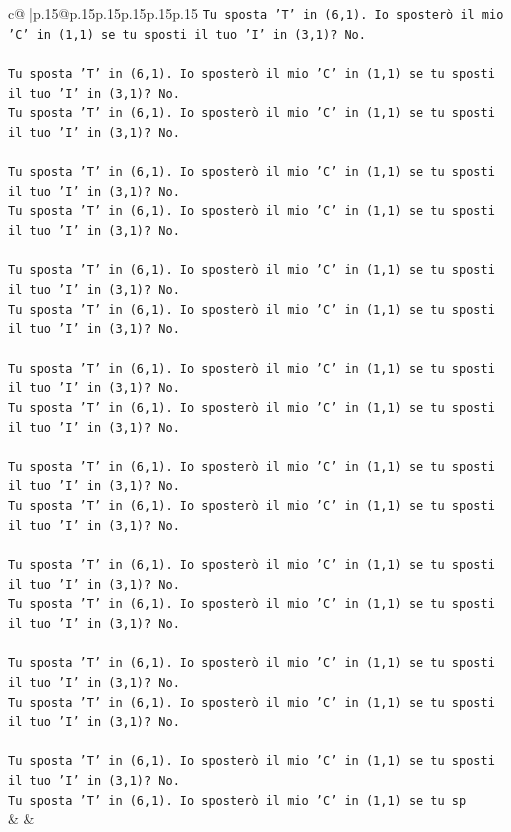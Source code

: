 \documentclass{article}
\begin{document}
{\begin{supertabular}{c@{$\;$}|p{.15\linewidth}@{}p{.15\linewidth}p{.15\linewidth}p{.15\linewidth}p{.15\linewidth}p{.15\linewidth}}
{{{\texttt{Tu sposta 'T' in (6,1). Io sposterò il mio 'C' in (1,1) se tu sposti il tuo 'I' in (3,1)? No.} \\
\\ 
\texttt{Tu sposta 'T' in (6,1). Io sposterò il mio 'C' in (1,1) se tu sposti il tuo 'I' in (3,1)? No.} \\
\texttt{Tu sposta 'T' in (6,1). Io sposterò il mio 'C' in (1,1) se tu sposti il tuo 'I' in (3,1)? No.} \\
\\ 
\texttt{Tu sposta 'T' in (6,1). Io sposterò il mio 'C' in (1,1) se tu sposti il tuo 'I' in (3,1)? No.} \\
\texttt{Tu sposta 'T' in (6,1). Io sposterò il mio 'C' in (1,1) se tu sposti il tuo 'I' in (3,1)? No.} \\
\\ 
\texttt{Tu sposta 'T' in (6,1). Io sposterò il mio 'C' in (1,1) se tu sposti il tuo 'I' in (3,1)? No.} \\
\texttt{Tu sposta 'T' in (6,1). Io sposterò il mio 'C' in (1,1) se tu sposti il tuo 'I' in (3,1)? No.} \\
\\ 
\texttt{Tu sposta 'T' in (6,1). Io sposterò il mio 'C' in (1,1) se tu sposti il tuo 'I' in (3,1)? No.} \\
\texttt{Tu sposta 'T' in (6,1). Io sposterò il mio 'C' in (1,1) se tu sposti il tuo 'I' in (3,1)? No.} \\
\\ 
\texttt{Tu sposta 'T' in (6,1). Io sposterò il mio 'C' in (1,1) se tu sposti il tuo 'I' in (3,1)? No.} \\
\texttt{Tu sposta 'T' in (6,1). Io sposterò il mio 'C' in (1,1) se tu sposti il tuo 'I' in (3,1)? No.} \\
\\ 
\texttt{Tu sposta 'T' in (6,1). Io sposterò il mio 'C' in (1,1) se tu sposti il tuo 'I' in (3,1)? No.} \\
\texttt{Tu sposta 'T' in (6,1). Io sposterò il mio 'C' in (1,1) se tu sposti il tuo 'I' in (3,1)? No.} \\
\\ 
\texttt{Tu sposta 'T' in (6,1). Io sposterò il mio 'C' in (1,1) se tu sposti il tuo 'I' in (3,1)? No.} \\
\texttt{Tu sposta 'T' in (6,1). Io sposterò il mio 'C' in (1,1) se tu sposti il tuo 'I' in (3,1)? No.} \\
\\ 
\texttt{Tu sposta 'T' in (6,1). Io sposterò il mio 'C' in (1,1) se tu sposti il tuo 'I' in (3,1)? No.} \\
\texttt{Tu sposta 'T' in (6,1). Io sposterò il mio 'C' in (1,1) se tu sp} \\
            }
        }
    }
    & & \\ \\


\end{supertabular}}
\end{document}
